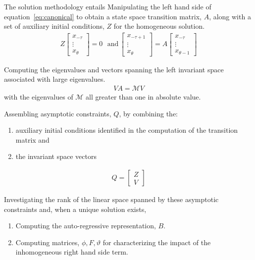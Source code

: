 \documentclass{beamer}
\begin{document}
\begin{frame}
The solution methodology entails 
Manipulating the left hand side of equation~\ref{eq:canonical} to obtain
 a state space transition matrix, $A$, along with
a set of auxiliary initial conditions, $Z$ for the homogeneous solution.
\begin{gather}
  Z
  \begin{bmatrix}
    x_{-\tau}\\ \vdots \\ x_{\theta}
  \end{bmatrix}=0 \,\,\,\,\text{and}\,   \begin{bmatrix}
    x_{-\tau+1}\\ \vdots \\ x_{\theta}
  \end{bmatrix}
=A   \begin{bmatrix}
    x_{-\tau}\\ \vdots \\ x_{\theta-1}
  \end{bmatrix}
\end{gather}

\end{frame}
\begin{frame}


 Computing the eigenvalues and vectors spanning 
the left invariant space associated with
large eigenvalues. 
\begin{gather}
 V A =   \mathcal{M}  V 
\end{gather}
with the eigenvalues of $ \mathcal{M}$ all greater than one in absolute value.

\end{frame}
\begin{frame}


 Assembling asymptotic
constraints, $Q$,   by combining the:
  \begin{enumerate}
\item  auxiliary initial conditions identified in the computation of the transition matrix and 
\item the invariant space vectors
  \end{enumerate}
\begin{gather}
  Q= 
  \begin{bmatrix}
    Z\\V
  \end{bmatrix}
\end{gather}

\end{frame}
\begin{frame}
 Investigating the rank of the linear space spanned by these asymptotic
constraints and,  when a unique solution exists, 
\begin{enumerate}
\item Computing the auto-regressive 
representation, $B$. 
\item Computing matrices, $\phi, F, \vartheta$ 
for characterizing the impact of the inhomogeneous
right hand side term.

\end{enumerate}
\end{frame}
\end{document}
